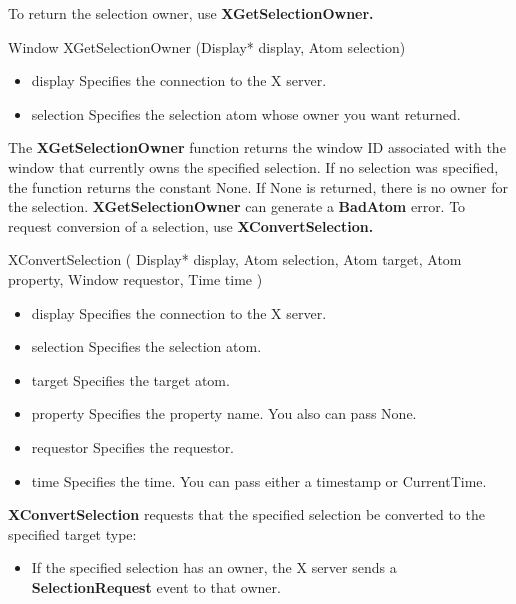 \documentclass{report}
\begin{document}
\begin{itemize}
        \bigbreak \noindent 
        To return the selection owner, use \textbf{XGetSelectionOwner.}
        \bigbreak \noindent 
        \begin{cppcode}
            Window XGetSelectionOwner (Display* display, Atom selection)
        \end{cppcode}
        \begin{itemize}
            \item display Specifies the connection to the X server.
            \item selection Specifies the selection atom whose owner you want returned.
        \end{itemize}
        The \textbf{XGetSelectionOwner} function returns the window ID associated with the window that currently owns the specified selection. If no selection was specified, the function returns the constant None. If None is returned, there is no owner for the selection.
        \bigbreak \noindent 
        \textbf{XGetSelectionOwner} can generate a \textbf{BadAtom} error.
        \bigbreak \noindent 
        To request conversion of a selection, use \textbf{XConvertSelection.}
        \bigbreak \noindent 
        \begin{cppcode}
            XConvertSelection (
                Display* display,
                Atom selection,
                Atom target,
                Atom property,
                Window requestor,
                Time time
            )
        \end{cppcode}
        \begin{itemize}
            \item display Specifies the connection to the X server.
            \item selection Specifies the selection atom.
            \item target Specifies the target atom.
            \item property Specifies the property name. You also can pass None.
            \item requestor Specifies the requestor.
            \item time Specifies the time. You can pass either a timestamp or CurrentTime.
        \end{itemize}
        \textbf{XConvertSelection} requests that the specified selection be converted to the specified target type:
        \begin{itemize}
            \item If the specified selection has an owner, the X server sends a \textbf{SelectionRequest} event to that owner.

\end{itemize}
\end{itemize}
\end{document}
